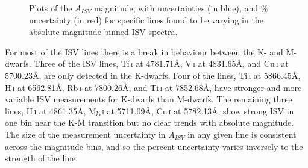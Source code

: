 \begin{figure}
    \hspace{-2cm}
	\captionsetup{width=.8\textwidth}
    \caption{Plots of the $A_{ISV}$ magnitude, with uncertainties (in blue), and \% uncertainty (in red) for specific lines found to be varying in the absolute magnitude binned ISV spectra.}
    \label{figGALAH_evo_5}
\end{figure}

For most of the ISV lines there is a break in behaviour between the K- and M-dwarfs. Three of the ISV lines, Ti\,\textsc{i} at 4781.71\hbox{\AA}, V\,\textsc{i} at 4831.65\hbox{\AA}, and Cu\,\textsc{i} at 5700.23\hbox{\AA}, are only detected in the K-dwarfs. Four of the lines, Ti\,\textsc{i} at 5866.45\hbox{\AA}, H\,\textsc{i} at 6562.81\hbox{\AA}, Rb\,\textsc{i} at 7800.26\hbox{\AA}, and Ti\,\textsc{i} at 7852.68\hbox{\AA}, have stronger and more variable ISV measurements for K-dwarfs than M-dwarfs. The remaining three lines, H\,\textsc{i} at 4861.35\hbox{\AA}, Mg\,\textsc{i} at 5711.09\hbox{\AA}, Cu\,\textsc{i} at 5782.13\hbox{\AA}, show strong ISV in one bin near the K-M transition but no clear trends with absolute magnitude. The size of the measurement uncertainty in $A_{ISV}$ in any given line is consistent across the magnitude bins, and so the percent uncertainty varies inversely to the strength of the line.\\

